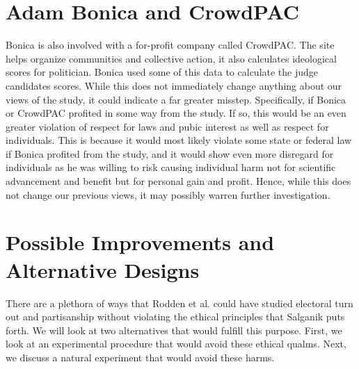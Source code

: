 \documentclass[12pt]{article}
\begin{document}
\section{Adam Bonica and CrowdPAC}

Bonica is also involved with a for-profit company called CrowdPAC. The site helps organize communities and collective action, it also calculates ideological scores for politician. Bonica used some of this data to calculate the judge candidates scores. While this does not immediately change anything about our views of the study, it could indicate a far greater misstep. Specifically, if Bonica or CrowdPAC profited in some way from the study. If so, this would be an even greater violation of respect for laws and pubic interest as well as respect for individuals. This is because it would most likely violate some state or federal law if Bonica profited from the study, and it would show even more disregard for individuals as he was willing to risk causing individual harm not for scientific advancement and benefit but for personal gain and profit. Hence, while this does not change our previous views, it may possibly warren further investigation.   

\section{Possible Improvements and Alternative Designs}

There are a plethora of ways that Rodden et al. could have studied electoral turn out and partisanship without violating the ethical principles that Salganik puts forth. We will look at two alternatives that would fulfill this purpose. First, we look at an experimental procedure that would avoid these ethical qualms. Next, we discuss a natural experiment that would avoid these harms. 
\end{document}
